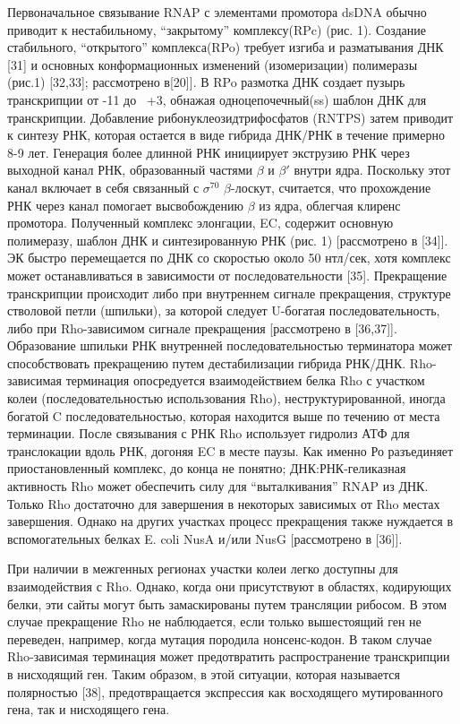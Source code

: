 \documentclass[a4paper,12pt]{article}
\begin{document}
        \par{Первоначальное связывание RNAP с элементами промотора dsDNA обычно приводит к нестабильному, “закрытому”
        комплексу(RPc) (рис. 1). Создание стабильного, “открытого” комплекса(RPo) требует изгиба и разматывания ДНК [31] и
        основных конформационных изменений (изомеризации) полимеразы (рис.1) [32,33]; рассмотрено в[20]]. В RPo размотка ДНК
        создает пузырь транскрипции от -11 до ~+3, обнажая одноцепочечный(ss) шаблон ДНК для транскрипции. Добавление
        рибонуклеозидтрифосфатов (RNTPS) затем приводит к синтезу РНК, которая остается в виде гибрида ДНК/РНК в течение
        примерно 8-9 лет. Генерация более длинной РНК инициирует экструзию РНК через выходной канал РНК, образованный частями
        \(\beta\) и \(\beta'\) внутри ядра. Поскольку этот канал включает в себя связанный с \(\sigma^{70}\)
        \(\beta\)-лоскут, считается, что прохождение РНК через канал помогает высвобождению \(\beta\) из ядра, облегчая
        клиренс промотора. Полученный комплекс элонгации, EC, содержит основную полимеразу, шаблон ДНК и синтезированную РНК
        (рис. 1) [рассмотрено в [34]]. ЭК быстро перемещается по ДНК со скоростью около 50 нтл/сек, хотя комплекс может
        останавливаться в зависимости от последовательности [35]. Прекращение транскрипции происходит либо при внутреннем
        сигнале прекращения, структуре стволовой петли (шпильки), за которой следует U-богатая последовательность, либо при
        Rho-зависимом сигнале прекращения [рассмотрено в [36,37]]. Образование шпильки РНК внутренней последовательностью
        терминатора может способствовать прекращению путем дестабилизации гибрида РНК/ДНК. Rho-зависимая терминация
        опосредуется взаимодействием белка Rho с участком колеи (последовательностью использования Rho), неструктурированной,
        иногда богатой C последовательностью, которая находится выше по течению от места терминации. После связывания с РНК
        Rho использует гидролиз АТФ для транслокации вдоль РНК, догоняя EC в месте паузы. Как именно Ро разъединяет
        приостановленный комплекс, до конца не понятно; ДНК:РНК-геликазная активность Rho может обеспечить силу для
        “выталкивания” RNAP из ДНК. Только Rho достаточно для завершения в некоторых зависимых от Rho местах завершения.
        Однако на других участках процесс прекращения также нуждается в вспомогательных белках E. coli NusA и/или NusG
        [рассмотрено в [36]].}
        \par{При наличии в межгенных регионах участки колеи легко доступны для взаимодействия с Rho. Однако, когда они
        присутствуют в областях, кодирующих белки, эти сайты могут быть замаскированы путем трансляции рибосом. В этом случае
        прекращение Rho не наблюдается, если только вышестоящий ген не переведен, например, когда мутация породила
        нонсенс-кодон. В таком случае Rho-зависимая терминация может предотвратить распространение транскрипции в нисходящий
        ген. Таким образом, в этой ситуации, которая называется полярностью [38], предотвращается экспрессия как восходящего
        мутированного гена, так и нисходящего гена.}
\end{document}
